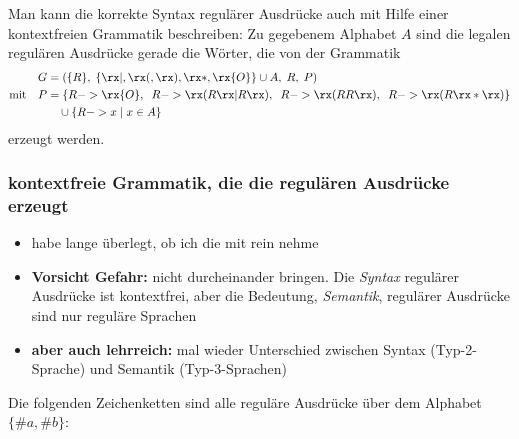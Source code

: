Man kann die korrekte Syntax regulärer Ausdrücke auch mit Hilfe einer
kontextfreien Grammatik beschreiben: Zu gegebenem Alphabet $A$ sind
die legalen regulären Ausdrücke gerade die Wörter, die von der
Grammatik
\begin{align*}
  G &= (\{R\}, \; \{\rx|, \rx(, \rx), \rx*, \rx{O}\}\cup A,\; R,\; P) \\
  \text{mit\quad } P &= \{ R-> \rx{O},\;\; R-> \rx( R\rx|R\rx),\;\; R-> \rx(RR\rx),\;\; R-> \rx(R\rx*\rx) \}\\
  &\quad\cup \{ R-> x \mid x\in A\} 
\end{align*}
erzeugt werden.

\begin{tutorium}
  \subsubsection*{kontextfreie Grammatik, die die regulären Ausdrücke erzeugt}
  \begin{itemize}
  \item habe lange überlegt, ob ich die mit rein nehme
  \item \textbf{Vorsicht Gefahr:} nicht durcheinander bringen. Die
    \emph{Syntax} regulärer Ausdrücke ist kontextfrei, aber die
    Bedeutung, \ie \emph{Semantik}, regulärer Ausdrücke sind nur
    reguläre Sprachen
  \item \textbf{aber auch lehrreich:} mal wieder Unterschied
    zwischen Syntax (Typ-2-Sprache) und Semantik (Typ-3-Sprachen)
  \end{itemize}
\end{tutorium}

Die folgenden Zeichenketten sind alle reguläre Ausdrücke über dem
Alphabet $\{\#a,\#b\}$:

